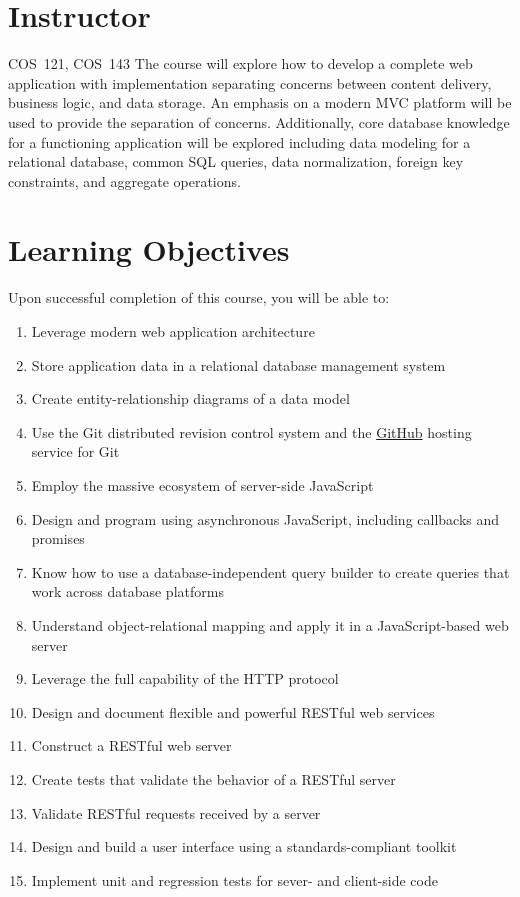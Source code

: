 \documentclass[11pt]{article}
\begin{document}


\section{Instructor}



\begin{catalogentry}{COS~121, COS~143}
  The course will explore how to develop a complete web application
  with implementation separating concerns between
  content delivery, business logic, and data storage.
  An emphasis on a modern MVC platform will be used
  to provide the separation of concerns.
  Additionally, core database knowledge for a functioning application
  will be explored including data modeling for a relational database,
  common SQL queries, data normalization, foreign key
  constraints, and aggregate operations.
\end{catalogentry}

\section{Learning Objectives}

Upon successful completion of this course,
you will be able to:
\begin{enumerate}
\item Leverage modern web application architecture
\item Store application data in a relational database management system
\item Create entity-relationship diagrams of a data model
\item Use the Git distributed revision control system
  and the \href{https://github.com/}{GitHub} hosting service for Git
\item Employ the massive ecosystem of server-side JavaScript
\item Design and program using asynchronous JavaScript,
  including callbacks and promises
\item Know how to use a database-independent query builder
  to create queries that work across database platforms
\item Understand object-relational mapping
  and apply it in a JavaScript-based web server
\item Leverage the full capability of the HTTP protocol
\item Design and document flexible and powerful RESTful web services
\item Construct a RESTful web server
\item Create tests that validate the behavior of a RESTful server
\item Validate RESTful requests received by a server
\item Design and build a user interface using a standards-compliant toolkit 
\item Implement unit and regression tests for sever- and client-side code
\end{enumerate}
\end{document}
